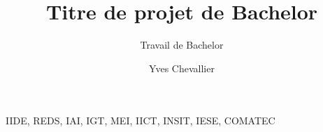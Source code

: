 \author{Yves Chevallier}

IIDE, REDS, IAI, IGT, MEI, IICT, INSIT, IESE, COMATEC




\title{Titre de projet de Bachelor}
\subtitle{Travail de Bachelor}

